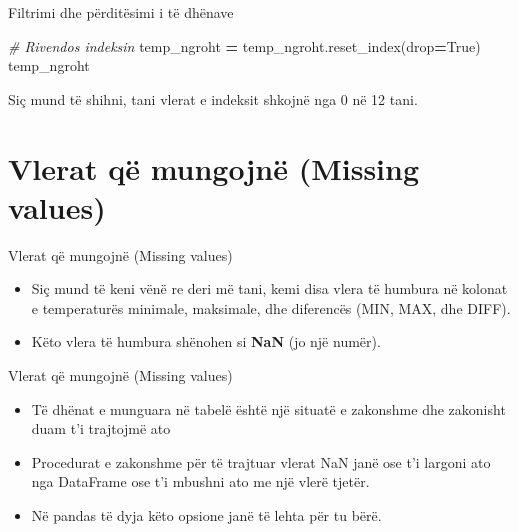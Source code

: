 \documentclass[
  ignorenonframetext,
]{beamer}
\newenvironment{Shaded}{\begin{snugshade}}{\end{snugshade}}
\newcommand{\CommentTok}[1]{\textcolor[rgb]{0.56,0.35,0.01}{\textit{#1}}}
\newcommand{\NormalTok}[1]{#1}
\newcommand{\OperatorTok}[1]{\textcolor[rgb]{0.81,0.36,0.00}{\textbf{#1}}}
\newcommand{\VariableTok}[1]{\textcolor[rgb]{0.00,0.00,0.00}{#1}}
\begin{document}
\begin{frame}[fragile]{Filtrimi dhe përditësimi i të dhënave}
\protect\hypertarget{filtrimi-dhe-puxebrdituxebsimi-i-tuxeb-dhuxebnave-6}{}
\begin{Shaded}
\begin{Highlighting}[]
\CommentTok{\# Rivendos indeksin}
\NormalTok{temp\_ngroht }\OperatorTok{=}\NormalTok{ temp\_ngroht.reset\_index(drop}\OperatorTok{=}\VariableTok{True}\NormalTok{)}
\NormalTok{temp\_ngroht}
\end{Highlighting}
\end{Shaded}

Siç mund të shihni, tani vlerat e indeksit shkojnë nga 0 në 12 tani.
\end{frame}

\hypertarget{vlerat-quxeb-mungojnuxeb-missing-values}{%
\section{Vlerat që mungojnë (Missing
values)}\label{vlerat-quxeb-mungojnuxeb-missing-values}}

\begin{frame}{Vlerat që mungojnë (Missing values)}
\protect\hypertarget{vlerat-quxeb-mungojnuxeb-missing-values-1}{}
\begin{itemize}
\item
  Siç mund të keni vënë re deri më tani, kemi disa vlera të humbura në
  kolonat e temperaturës minimale, maksimale, dhe diferencës (MIN, MAX,
  dhe DIFF).
\item
  Këto vlera të humbura shënohen si \textbf{NaN} (jo një numër).
\end{itemize}
\end{frame}

\begin{frame}{Vlerat që mungojnë (Missing values)}
\protect\hypertarget{vlerat-quxeb-mungojnuxeb-missing-values-2}{}
\begin{itemize}
\item
  Të dhënat e munguara në tabelë është një situatë e zakonshme dhe
  zakonisht duam t'i trajtojmë ato
\item
  Procedurat e zakonshme për të trajtuar vlerat NaN janë ose t'i largoni
  ato nga DataFrame ose t'i mbushni ato me një vlerë tjetër.
\item
  Në pandas të dyja këto opsione janë të lehta për tu bërë.
\end{itemize}
\end{frame}
\end{document}
